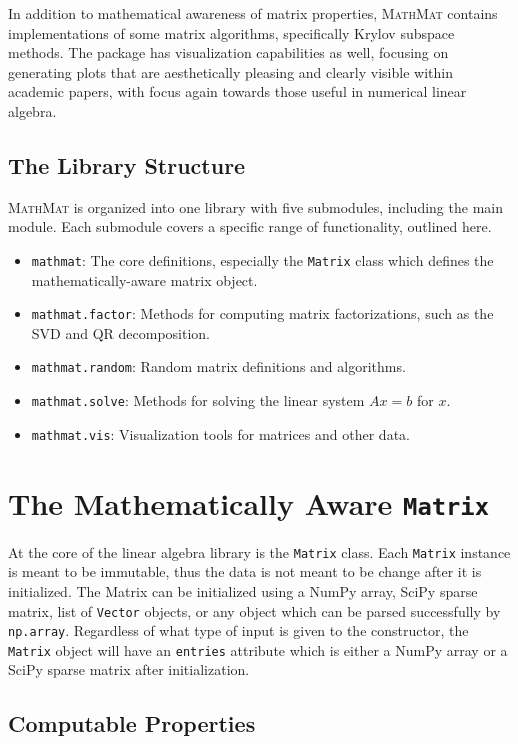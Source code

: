 \documentclass[12pt,a4paper]{article}
\newcommand{\mathmat}{\textsc{MathMat} }
\newcommand{\ct}[1]{\texttt{#1}}
\begin{document}
In addition to mathematical awareness of matrix properties, \mathmat contains implementations of some matrix algorithms, specifically Krylov subspace methods. The package has visualization capabilities as well, focusing on generating plots that are aesthetically pleasing and clearly visible within academic papers, with focus again towards those useful in numerical linear algebra.

\subsection{The Library Structure}

\mathmat is organized into one library with five submodules, including the main module. Each submodule covers a specific range of functionality, outlined here.

\begin{itemize}
    \item \ct{mathmat}: The core definitions, especially the \ct{Matrix} class which defines the mathematically-aware matrix object.
    \item \ct{mathmat.factor}: Methods for computing matrix factorizations, such as the SVD and QR  decomposition.
    \item \ct{mathmat.random}: Random matrix definitions and algorithms.
    \item \ct{mathmat.solve}: Methods for solving the linear system $A x = b$ for $x$.
    \item \ct{mathmat.vis}: Visualization tools for matrices and other data.
\end{itemize}

\section{The Mathematically Aware \ct{Matrix}}

At the core of the linear algebra library is the \ct{Matrix} class. Each \ct{Matrix} instance is meant to be immutable, thus the data is not meant to be change after it is initialized. The Matrix can be initialized using a NumPy array, SciPy sparse matrix, list of \ct{Vector} objects, or any object which can be parsed successfully by \ct{np.array}. Regardless of what type of input is given to the constructor, the \ct{Matrix} object will have an \ct{entries} attribute which is either a NumPy array or a SciPy sparse matrix after initialization.

\subsection{Computable Properties}
\end{document}
